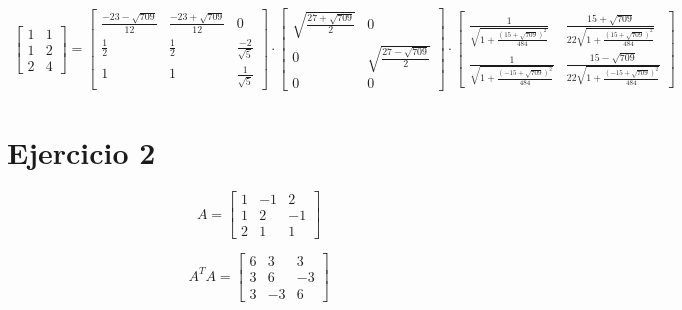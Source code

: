 \documentclass[a4paper, spanish]{article}
\begin{document}
    \begin{align}
      \begin{bmatrix}
        1 & 1\\
        1 & 2\\
        2 & 4
      \end{bmatrix}
      =
      \begin{bmatrix}
        \frac{-23-\sqrt{709}}{12} & \frac{-23+\sqrt{709}}{12} & 0 \\
        \frac{1}{2} & \frac{1}{2} & \frac{-2}{\sqrt{5}} \\
        1 & 1 & \frac{1}{\sqrt{5}}
      \end{bmatrix}
      \cdot
      \begin{bmatrix}
        \sqrt{\frac{27 + \sqrt{709}}{2}} & 0 \\
        0 & \sqrt{\frac{27 - \sqrt{709}}{2}} \\
        0 & 0
      \end{bmatrix}
      \cdot
      \begin{bmatrix}
        \frac{1}{\sqrt{1 + \frac{(15 + \sqrt{709})^2}{484}}} &  \frac{15 + \sqrt{709}}{22\sqrt{1 + \frac{(15 + \sqrt{709})^2}{484}}}  \\
        \frac{1}{\sqrt{1 + \frac{(- 15 + \sqrt{709})^2}{484}}} & \frac{15 - \sqrt{709}}{22\sqrt{1 + \frac{(- 15 + \sqrt{709})^2}{484}}}
      \end{bmatrix}
    \end{align}


  \section{Ejercicio 2}


  \begin{equation}
    A =
    \begin{bmatrix}
      1 & -1 & 2\\
      1 & 2 & -1\\
      2 & 1 & 1
    \end{bmatrix}
  \end{equation}


  \begin{equation}
    A^TA =
    \begin{bmatrix}
      6 & 3 & 3 \\
      3 & 6 & -3 \\
      3 & -3 & 6
    \end{bmatrix}
  \end{equation}
\end{document}
